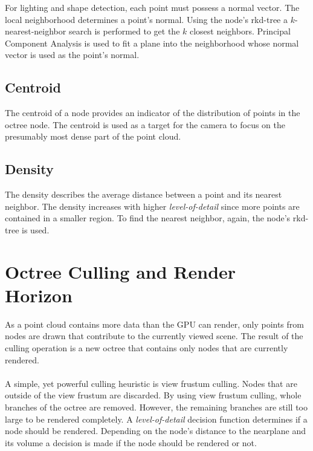 For lighting and shape detection, each point must possess a normal vector. The local neighborhood determines a point's normal. Using the node's rkd-tree a $k$-nearest-neighbor search is performed to get the $k$ closest neighbors. Principal Component Analysis \cite{jolliffe2002principal} is used to fit a plane into the neighborhood whose normal vector is used as the point's normal.


\subsection{Centroid}

The centroid of a node provides an indicator of the distribution of points in the octree node. The centroid is used as a target for the camera to focus on the presumably most dense part of the point cloud. 


\subsection{Density}

The density describes the average distance between a point and its nearest neighbor. The density increases with higher \textit{level-of-detail} since more points are contained in a smaller region. To find the nearest neighbor, again, the node's rkd-tree is used. 


\section{Octree Culling and Render Horizon}
\label{sec:renderHorizon}

As a point cloud contains more data than the GPU can render, only points from nodes are drawn that contribute to the currently viewed scene. The result of the culling operation is a new octree that contains only nodes that are currently rendered. 
\\
\\
A simple, yet powerful culling heuristic is view frustum culling. Nodes that are outside of the view frustum are discarded. By using view frustum culling, whole branches of the octree are removed. However, the remaining branches are still too large to be rendered completely. A \textit{level-of-detail} decision function determines if a node should be rendered. Depending on the node's distance to the nearplane and its volume a decision is made if the node should be rendered or not. 

